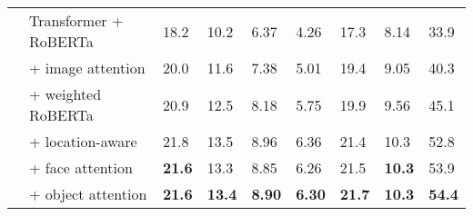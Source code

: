 \begin{table*}[p]
\begin{tabularx}{\textwidth}{llXXXXXXX}
       & Transformer + RoBERTa                        & 18.2   & 10.2   & 6.37   & 4.26   & 17.3  & 8.14   & 33.9  \\
       & \quad + image attention           & 20.0   & 11.6   & 7.38   & 5.01   & 19.4  & 9.05   & 40.3  \\
       & \quad\quad + weighted RoBERTa                 & 20.9   & 12.5   & 8.18   & 5.75   & 19.9  & 9.56   & 45.1  \\
       & \quad\quad\quad + location-aware              & 21.8   & 13.5   & 8.96   & 6.36   & 21.4  & 10.3   & 52.8  \\
       & \quad\quad\quad\quad + face attention         & \textbf{21.6}   & 13.3   & 8.85   & 6.26   & 21.5  & \textbf{10.3}   & 53.9  \\
       & \quad\quad\quad\quad\quad + object attention  & \textbf{21.6}   & \textbf{13.4}   & \textbf{8.90}   & \textbf{6.30}   & \textbf{21.7}  & \textbf{10.3}   & \textbf{54.4}  \\
      \bottomrule
   \end{tabularx}
\end{table*}


